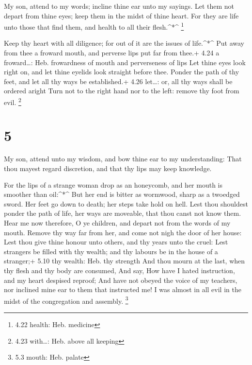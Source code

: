  My son, attend to my words; incline thine ear unto my
sayings.  Let them not depart from thine eyes; keep them in
the midst of thine heart.  For they are life unto those
that find them, and health to all their flesh.\^{}*\^{} \footnote{4.22
  health: Heb. medicine}

 Keep thy heart with all diligence; for out of it are the
issues of life.\^{}*\^{}  Put away from thee a froward
mouth, and perverse lips put far from thee.+ 4.24 a froward\ldots: Heb.
frowardness of mouth and perverseness of lips  Let thine
eyes look right on, and let thine eyelids look straight before thee.
 Ponder the path of thy feet, and let all thy ways be
established.+ 4.26 let\ldots: or, all thy ways shall be ordered aright
 Turn not to the right hand nor to the left: remove thy
foot from evil. \footnote{4.23 with\ldots: Heb. above all keeping}

\hypertarget{section-4}{%
\section{5}\label{section-4}}

 My son, attend unto my wisdom, and bow thine ear to my
understanding:  That thou mayest regard discretion, and that
thy lips may keep knowledge.

 For the lips of a strange woman drop as an honeycomb, and
her mouth is smoother than oil:\^{}*\^{}  But her end is
bitter as wormwood, sharp as a twoedged sword.  Her feet go
down to death; her steps take hold on hell.  Lest thou
shouldest ponder the path of life, her ways are moveable, that thou
canst not know them.  Hear me now therefore, O ye children,
and depart not from the words of my mouth.  Remove thy way
far from her, and come not nigh the door of her house:  Lest
thou give thine honour unto others, and thy years unto the cruel:
 Lest strangers be filled with thy wealth; and thy labours
be in the house of a stranger;+ 5.10 thy wealth: Heb. thy strength
 And thou mourn at the last, when thy flesh and thy body
are consumed,  And say, How have I hated instruction, and
my heart despised reproof;  And have not obeyed the voice
of my teachers, nor inclined mine ear to them that instructed me!
 I was almost in all evil in the midst of the congregation
and assembly. \footnote{5.3 mouth: Heb. palate}

